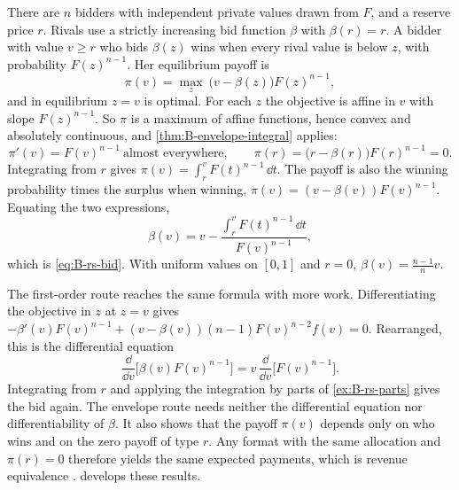 \begin{example}\label{ex:B-auction-envelope}
There are $n$ bidders with independent private values drawn from $F$, and a reserve price $r$. Rivals use a strictly
increasing bid function $\beta$ with $\beta(r) = r$. A bidder with value $v \geq r$ who bids $\beta(z)$ wins when every rival
value is below $z$, with probability $F(z)^{n - 1}$. Her equilibrium payoff is
\begin{equation*}
\pi(v) = \max_{z}\ \big(v - \beta(z)\big)F(z)^{n - 1} ,
\end{equation*}
and in equilibrium $z = v$ is optimal. For each $z$ the objective is affine in $v$ with slope $F(z)^{n - 1}$. So $\pi$ is a
maximum of affine functions, hence convex and absolutely continuous, and \cref{thm:B-envelope-integral} applies:
\begin{equation*}
\pi'(v) = F(v)^{n - 1} \ \text{almost everywhere}, \qquad \pi(r) = \big(r - \beta(r)\big)F(r)^{n - 1} = 0 .
\end{equation*}
Integrating from $r$ gives $\pi(v) = \int_r^vF(t)^{n - 1}\,\dd t$. The payoff is also the winning probability times the
surplus when winning, $\pi(v) = (v - \beta(v))F(v)^{n - 1}$. Equating the two expressions,
\begin{equation*}
\beta(v) = v - \frac{\int_r^vF(t)^{n - 1}\,\dd t}{F(v)^{n - 1}} ,
\end{equation*}
which is \eqref{eq:B-rs-bid}. With uniform values on $[0, 1]$ and $r = 0$, $\beta(v) = \frac{n - 1}{n}v$.

The first-order route reaches the same formula with more work. Differentiating the objective in $z$ at $z = v$ gives
$-\beta'(v)F(v)^{n - 1} + (v - \beta(v))(n - 1)F(v)^{n - 2}f(v) = 0$. Rearranged, this is the differential equation
\begin{equation*}
\frac{\dd}{\dd v}\Big[\beta(v)F(v)^{n - 1}\Big] = v\,\frac{\dd}{\dd v}\Big[F(v)^{n - 1}\Big] .
\end{equation*}
Integrating from $r$ and applying the integration by parts of \cref{ex:B-rs-parts} gives the bid again. The envelope
route needs neither the differential equation nor differentiability of $\beta$. It also shows that the payoff
$\pi(v)$ depends only on who wins and on the zero payoff of type $r$. Any format with the same allocation and
$\pi(r) = 0$ therefore yields the same expected payments, which is revenue equivalence \citep{Myerson1981,
RileySamuelson1981}.  develops these results.
\end{example}

